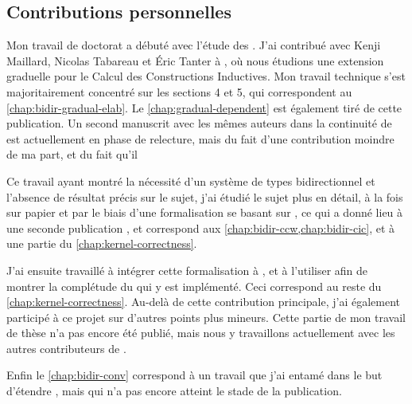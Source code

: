 \subsection{Contributions personnelles}

Mon travail de doctorat a débuté avec l’étude des  .
J’ai contribué avec Kenji Maillard, Nicolas Tabareau et Éric Tanter à
, où nous étudions une extension graduelle
pour le Calcul des Constructions Inductives. Mon travail technique s’est
majoritairement concentré sur les sections 4 et 5,
qui correspondent au \cref{chap:bidir-gradual-elab}.
Le \cref{chap:gradual-dependent} est également tiré de cette publication.
Un second manuscrit avec les mêmes auteurs dans la continuité de
\cite{LennonBertrand2020} est actuellement en phase de relecture, mais du
fait d’une contribution moindre de ma part, et du fait qu’il

Ce travail ayant montré la nécessité d’un système de types bidirectionnel
et l’absence de résultat précis sur le sujet, j’ai
étudié le sujet plus en détail, à la fois sur papier et par le biais d’une
formalisation se basant sur , ce qui a donné lieu à une seconde publication
, et correspond aux
\cref{chap:bidir-ccw,chap:bidir-cic}, et à une partie du
\cref{chap:kernel-correctness}.

J’ai ensuite travaillé à intégrer cette formalisation à
, et à l’utiliser afin de montrer la complétude du 
qui y est implémenté. Ceci correspond au reste du \cref{chap:kernel-correctness}.
Au-delà de cette contribution principale,
j’ai également participé à ce projet sur d’autres points plus mineurs.
Cette partie de mon travail de thèse n’a pas encore été publié, mais nous y
travaillons actuellement avec les autres contributeurs de .

Enfin le \cref{chap:bidir-conv} correspond à un travail que j’ai entamé dans
le but d’étendre , mais qui n’a pas encore atteint le stade de la
publication.